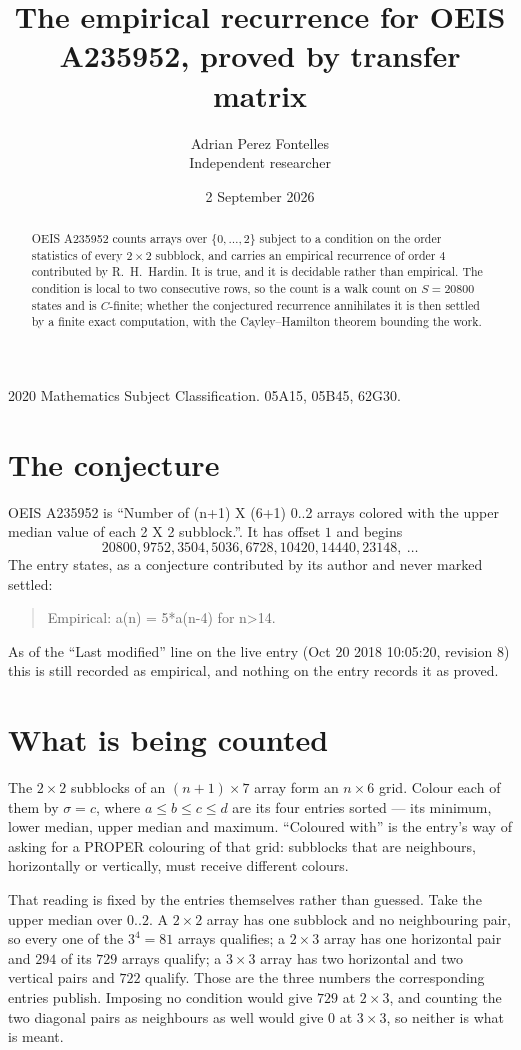 \documentclass[11pt,a4paper]{article}
\title{The empirical recurrence for OEIS A235952, proved by transfer matrix}
\author{Adrian Perez Fontelles\\ \small Independent researcher}
\date{2 September 2026}
\theoremstyle{plain}
\theoremstyle{definition}
\begin{document}
\maketitle

\begin{abstract}
OEIS A235952 counts arrays over $\{0,\dots,2\}$ subject to a condition on the order
statistics of every $2\times2$ subblock, and carries an empirical recurrence of order
$4$ contributed by R.~H.~Hardin. It is true, and it is decidable rather than empirical.
The condition is local to two consecutive rows, so the count is a walk count on $S=20800$
states and is $C$-finite; whether the conjectured recurrence annihilates it is then settled by
a finite exact computation, with the Cayley--Hamilton theorem bounding the work.
\end{abstract}

\noindent\small 2020 Mathematics Subject Classification. 05A15, 05B45, 62G30.\normalsize

\section{The conjecture}

OEIS A235952 is ``Number of (n+1) X (6+1) 0..2 arrays colored with the upper median value of each 2 X 2 subblock.''. It has offset $1$ and begins
\[
20800, 9752, 3504, 5036, 6728, 10420, 14440, 23148,\ \dots
\]
The entry states, as a conjecture contributed by its author and never marked settled:
\begin{quote}
Empirical: a(n) = 5*a(n-4) for n>14.
\end{quote}
As of the ``Last modified'' line on the live entry (Oct 20 2018 10:05:20, revision 8) this is still
recorded as empirical, and nothing on the entry records it as proved.

\section{What is being counted}

The $2\times2$ subblocks of an $(n+1)\times7$ array form an
$n\times6$ grid. Colour each of them by $\sigma=c$, where $a\le b\le c\le d$ are its four entries sorted --- its minimum, lower median, upper median and maximum. ``Coloured with'' is the entry's way of
asking for a PROPER colouring of that grid: subblocks that are neighbours, horizontally or
vertically, must receive different colours.

That reading is fixed by the entries themselves rather than guessed. Take the upper median
over $0..2$. A $2\times2$ array has one subblock and no neighbouring pair, so every one of the
$3^4=81$ arrays qualifies; a $2\times3$ array has one horizontal pair and $294$ of its $729$
arrays qualify; a $3\times3$ array has two horizontal and two vertical pairs and $722$
qualify. Those are the three numbers the corresponding entries publish. Imposing no condition
would give $729$ at $2\times3$, and counting the two diagonal pairs as neighbours as well
would give $0$ at $3\times3$, so neither is what is meant.
\end{document}
